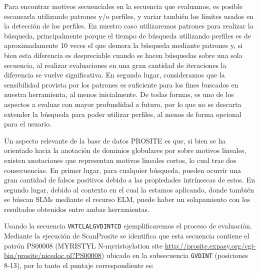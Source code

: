 Para encontrar motivos secuenciales en la secuencia que evaluamos, es posible escanearla utilizando patrones y/o perfiles, y variar también los límites usados en la detección de los perfiles. 
En nuestro caso utilizaremos patrones para realizar la búsqueda, principalmente porque el tiempo de búsqueda utilizando perfiles es de aproximadamente 10 veces el que demora la búsqueda mediante patrones 
y, si bien esta diferencia es despreciable cuando se hacen búsquedas sobre una sola secuencia, al realizar evaluaciones en una gran cantidad de iteraciones la diferencia se vuelve significativa.
En segundo lugar, consideramos que la sensibilidad provista por los patrones es suficiente para los fines buscados en nuestra herramienta, al menos inicialmente.
De todas formas, es uno de los aspectos a evaluar con mayor profundidad a futuro, por lo que no se descarta extender la búsqueda para poder utilizar perfiles, al menos de forma opcional para el usuario. 

Un aspecto relevante de la base de datos PROSITE es que, si bien se ha orientado hacia la anotación de dominios globulares por sobre motivos lineales, existen anotaciones que representan motivos lineales cortos, 
lo cual trae dos consecuencias. En primer lugar, para cualquier búsqueda, pueden ocurrir una gran cantidad de falsos positivos debido a las propiedades intrínsecas de estos.
En segundo lugar, debido al contexto en el cual la estamos aplicando, donde también se búscan SLMs mediante el recurso ELM, puede haber un solapamiento con los resultados obtenidos entre ambas herramientas.

Usando la secuencia \texttt{VKTCLALGVDINTCD} ejemplificaremos el proceso de evaluación.
Mediante la ejecución de ScanProsite se identifica que esta secuencia contiene el patrón PS00008 (MYRISTYL N-myristoylation site 
\url{http://prosite.expasy.org/cgi-bin/prosite/nicedoc.pl?PS00008}) ubicado en la subsecuencia \texttt{GVDINT} (posiciones 8-13), por lo tanto el puntaje correspondiente es:

